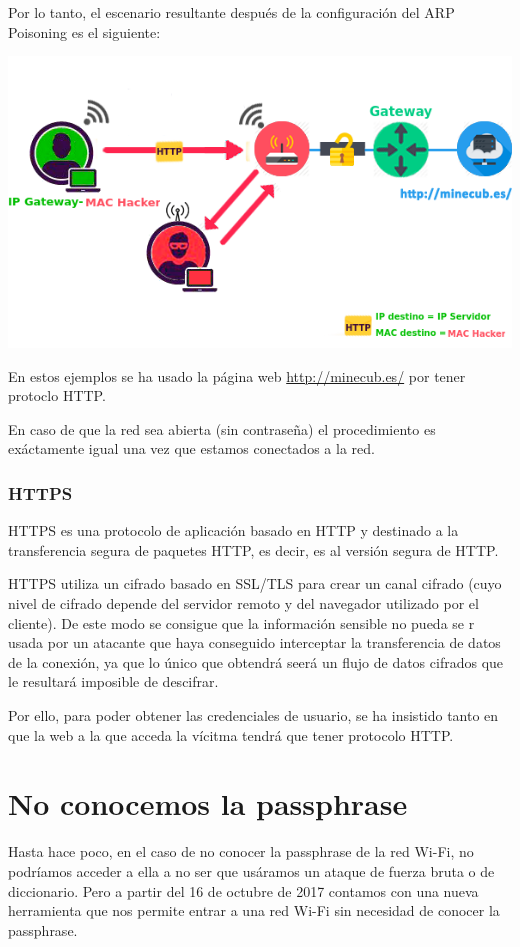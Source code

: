 \newpage
Por lo tanto, el escenario resultante después de la configuración del ARP Poisoning es el siguiente:
\begin{center}
	\includegraphics[scale=0.7]{escenario.png}
\end{center}

\Nota En estos ejemplos se ha usado la página web \url{http://minecub.es/} por tener protoclo HTTP.

\Nota En caso de que la red sea abierta (sin contraseña) el procedimiento es exáctamente igual una vez que estamos conectados a la red.

\subsubsection{HTTPS}
HTTPS es una protocolo de aplicación basado en HTTP y destinado a la transferencia segura de paquetes HTTP, es decir, es al versión segura de HTTP.

HTTPS utiliza un cifrado basado en SSL/TLS para crear un canal cifrado (cuyo nivel de cifrado depende del servidor remoto y del navegador utilizado por el cliente). De este modo se consigue que la información sensible no pueda se r usada por un atacante que haya conseguido interceptar la transferencia de datos de la conexión, ya que lo único que obtendrá seerá un flujo de datos cifrados que le resultará imposible de descifrar.

Por ello, para poder obtener las credenciales de usuario, se ha insistido tanto en que la web a la que acceda la vícitma tendrá que tener protocolo HTTP.

\section{No conocemos la passphrase}
Hasta hace poco, en el caso de no conocer la passphrase de la red Wi-Fi, no podríamos acceder a ella a no ser que usáramos un ataque de fuerza bruta o de diccionario. Pero a partir del 16 de octubre de 2017 contamos con una nueva herramienta que nos permite entrar a una red Wi-Fi sin necesidad de conocer la passphrase.

